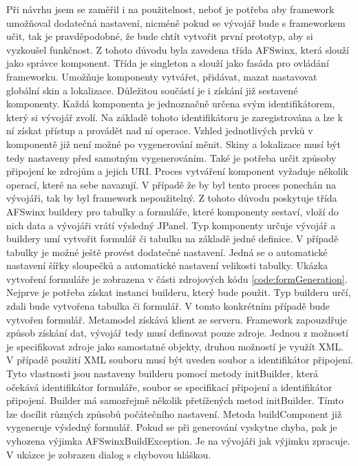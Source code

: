 Při návrhu jsem se zaměřil i na použitelnost, neboť je potřeba aby framework umožňoval dodatečná nastavení, nicméně pokud se vývojář bude s frameworkem učit, tak je pravděpodobné, že bude chtít vytvořit první prototyp, aby si vyzkoušel funkčnost. Z tohoto důvodu byla zavedena třída AFSwinx, která slouží jako správce komponent. Třída je singleton \cite{gamma} a slouží jako fasáda \cite{gamma}pro ovládání frameworku.  Umožňuje komponenty vytvářet, přidávat, mazat nastavovat globální skin a lokalizace. Důležitou součástí je i získání již sestavené komponenty. Každá komponenta je jednoznačně určena svým identifikátorem, který si vývojář zvolí. Na základě tohoto identifikátoru je zaregistrována a lze k ní získat přístup a provádět nad ní operace. Vzhled jednotlivých prvků v komponentě již není možné po vygenerování měnit. Skiny a lokalizace musí být tedy nastaveny před samotným vygenerováním. Také je potřeba určit způsoby připojení ke zdrojům a jejich URI. Proces vytváření komponent vyžaduje několik operací, které na sebe navazují. V případě že by byl tento proces ponechán na vývojáři, tak by byl framework nepoužitelný. Z tohoto důvodu poskytuje třída AFSwinx buildery \cite{gamma} pro tabulky a formuláře, které komponenty sestaví, vloží do nich data a vývojáři vrátí výsledný JPanel. Typ komponenty určuje vývojář a buildery umí vytvořit formulář či tabulku na základě jedné definice. V případě tabulky je možné ještě provést dodatečné nastavení. Jedná se o automatické nastavení šířky sloupečků a automatické nastavení velikosti tabulky. Ukázka vytvoření formuláře je zobrazena v části zdrojových kódu \ref{code:formGeneration}. Nejprve je potřeba získat instanci builderu, který bude použit. Typ builderu určí, zdali bude vytvořena tabulka či formulář. V tomto konkrétním případě bude vytvořen formulář. Metamodel získává klient ze serveru. Framework zapouzdřuje způsob získání dat, vývojář tedy musí definovat pouze zdroje. Jednou z možností je specifikovat zdroje jako samostatné objekty, druhou možností je využít XML. V případě použití XML souboru musí být uveden soubor a identifikátor připojení. Tyto vlastnosti jsou nastaveny builderu pomocí metody initBuilder, která očekává identifikátor formuláře, soubor se specifikací připojení a identifikátor připojení. Builder má samozřejmě několik přetížených metod initBuilder. Tímto lze docílit různých způsobů počátečního nastavení. Metoda buildComponent již vygeneruje výsledný formulář. Pokud se při generování vyskytne chyba, pak je vyhozena výjimka AFSwinxBuildException. Je na vývojáři jak výjimku zpracuje. V ukázce je zobrazen dialog s chybovou hláškou.

